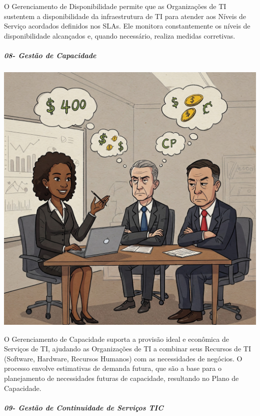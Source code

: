 \documentclass[
]{book}
\begin{document}
O Gerenciamento de Disponibilidade permite que as Organizações de TI sustentem a disponibilidade da infraestrutura de TI para atender aos Níveis de Serviço acordados definidos nos SLAs. Ele monitora constantemente os níveis de disponibilidade alcançados e, quando necessário, realiza medidas corretivas.

\subparagraph{08- Gestão de Capacidade}\label{gestuxe3o-de-capacidade}

\includegraphics{images/InfraEstrutura/ITIL/08-Gestao_de_capacidade.jpg}

O Gerenciamento de Capacidade suporta a provisão ideal e econômica de Serviços de TI, ajudando as Organizações de TI a combinar seus Recursos de TI (Software, Hardware, Recursos Humanos) com as necessidades de negócios. O processo envolve estimativas de demanda futura, que são a base para o planejamento de necessidades futuras de capacidade, resultando no Plano de Capacidade.

\subparagraph{09- Gestão de Continuidade de Serviços TIC}\label{gestuxe3o-de-continuidade-de-serviuxe7os-tic}
\end{document}
